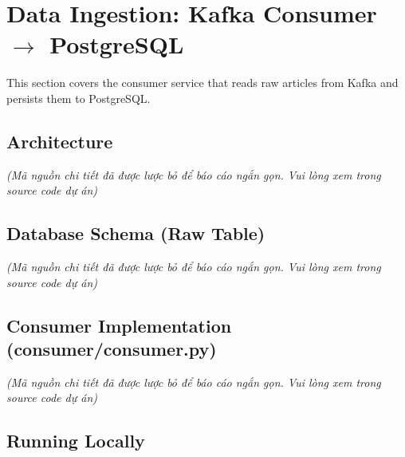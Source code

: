 \hypertarget{data-ingestion-kafka-consumer-rightarrow-postgresql}{%
\section{\texorpdfstring{Data Ingestion: Kafka Consumer \(\rightarrow\)
PostgreSQL}{Data Ingestion: Kafka Consumer \textbackslash rightarrow PostgreSQL}}}

This section covers the consumer service that reads raw articles from
Kafka and persists them to PostgreSQL.

\hypertarget{architecture}{%
\subsection{Architecture}}

\emph{(Mã nguồn chi tiết đã được lược bỏ để báo cáo ngắn gọn. Vui lòng
xem trong source code dự án)}

\hypertarget{database-schema-raw-table}{%
\subsection{Database Schema (Raw
Table)}}

\emph{(Mã nguồn chi tiết đã được lược bỏ để báo cáo ngắn gọn. Vui lòng
xem trong source code dự án)}

\hypertarget{consumer-implementation-consumerconsumer.py}{%
\subsection{Consumer Implementation
(consumer/consumer.py)}}

\emph{(Mã nguồn chi tiết đã được lược bỏ để báo cáo ngắn gọn. Vui lòng
xem trong source code dự án)}

\hypertarget{running-locally}{%
\subsection{Running Locally}}

\begin{Shaded}
\begin{Highlighting}[]


\end{Highlighting}
\end{Shaded}

